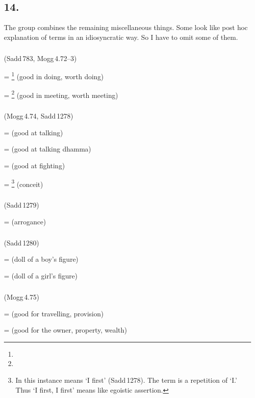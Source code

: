 \subsection*{14.\ }\label{tadgroup14}

The group combines the remaining miscellaneous things. Some look like post hoc explanation of terms in an idiosyncratic way. So I have to omit some of them.

\subparagraph*{} (Sadd\,783, Mogg\,4.72--3)\label{pacct14:dnaya}

 = \footnote{} (good in doing, worth doing) \par
{} = \footnote{} (good in meeting, worth meeting) \par

\subparagraph*{} (Mogg\,4.74, Sadd\,1278)\label{pacct14:ika}

 =  (good at talking) \par
{} =  (good at talking dhamma) \par
{} =  (good at fighting) \par
{} = \footnote{In this instance  means `I first' (Sadd\,1278). The term is a repetition of `I.' Thus `I first, I first' means like egoistic assertion.} (conceit) \par

\subparagraph*{} (Sadd\,1279)\label{pacct14:dnika}

 =  (arrogance) \par

\subparagraph*{} (Sadd\,1280)\label{pacct14:lika}

 =  (doll of a boy's figure) \par
{} =  (doll of a girl's figure) \par

\subparagraph*{} (Mogg\,4.75)\label{pacct14:dneyya}

 =  (good for travelling, provision) \par
{} =  (good for the owner, property, wealth) \par

